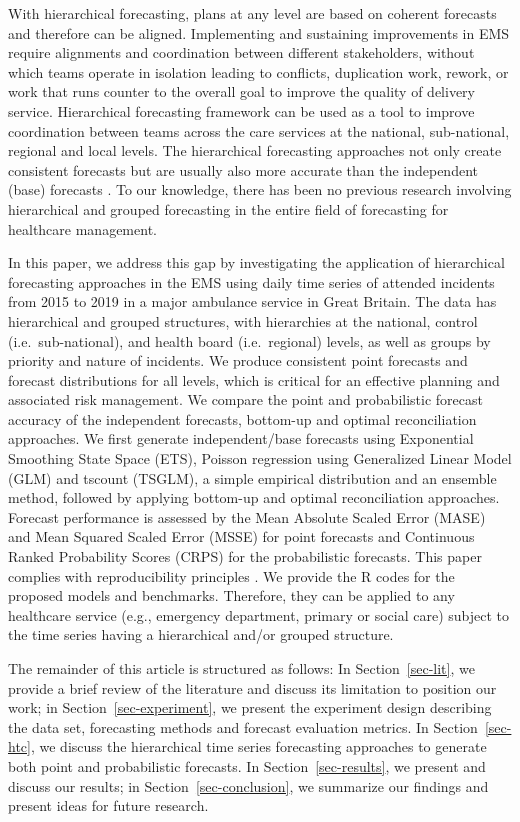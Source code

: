 \documentclass[
  authoryear,
  preprint,
  3p]{elsarticle}
\begin{document}
With hierarchical forecasting, plans at any level are based on coherent
forecasts and therefore can be aligned. Implementing and sustaining
improvements in EMS require alignments and coordination between
different stakeholders, without which teams operate in isolation leading
to conflicts, duplication work, rework, or work that runs counter to the
overall goal to improve the quality of delivery service. Hierarchical
forecasting framework can be used as a tool to improve coordination
between teams across the care services at the national, sub-national,
regional and local levels. The hierarchical forecasting approaches not
only create consistent forecasts but are usually also more accurate than
the independent (base) forecasts \citep{hyndman2011optimal}. To our
knowledge, there has been no previous research involving hierarchical
and grouped forecasting in the entire field of forecasting for
healthcare management.

In this paper, we address this gap by investigating the application of
hierarchical forecasting approaches in the EMS using daily time series
of attended incidents from 2015 to 2019 in a major ambulance service in
Great Britain. The data has hierarchical and grouped structures, with
hierarchies at the national, control (i.e.~sub-national), and health
board (i.e.~regional) levels, as well as groups by priority and nature
of incidents. We produce consistent point forecasts and forecast
distributions for all levels, which is critical for an effective
planning and associated risk management. We compare the point and
probabilistic forecast accuracy of the independent forecasts, bottom-up
and optimal reconciliation approaches. We first generate
independent/base forecasts using Exponential Smoothing State Space
(ETS), Poisson regression using Generalized Linear Model (GLM) and
tscount (TSGLM), a simple empirical distribution and an ensemble method,
followed by applying bottom-up and optimal reconciliation approaches.
Forecast performance is assessed by the Mean Absolute Scaled Error
(MASE) and Mean Squared Scaled Error (MSSE) for point forecasts and
Continuous Ranked Probability Scores (CRPS) for the probabilistic
forecasts. This paper complies with reproducibility principles
\citep{stodden2013best, boylan2015reproducibility}. We provide the R
codes for the proposed models and benchmarks. Therefore, they can be
applied to any healthcare service (e.g., emergency department, primary
or social care) subject to the time series having a hierarchical and/or
grouped structure.

The remainder of this article is structured as follows: In
Section~\ref{sec-lit}, we provide a brief review of the literature and
discuss its limitation to position our work; in
Section~\ref{sec-experiment}, we present the experiment design
describing the data set, forecasting methods and forecast evaluation
metrics. In Section~\ref{sec-htc}, we discuss the hierarchical time
series forecasting approaches to generate both point and probabilistic
forecasts. In Section~\ref{sec-results}, we present and discuss our
results; in Section~\ref{sec-conclusion}, we summarize our findings and
present ideas for future research.
\end{document}
